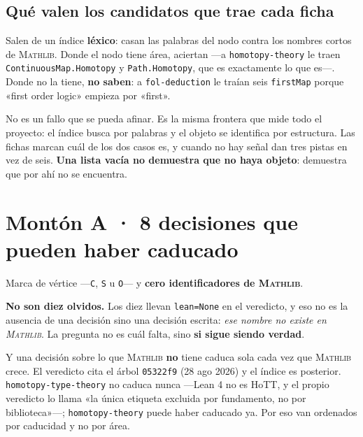 \documentclass[10pt,a4paper]{article}
\newcommand{\Mathlib}{\textsc{Mathlib}}
\begin{document}
\subsection*{Qué valen los candidatos que trae cada ficha}
\noindent Salen de un índice \textbf{léxico}: casan las palabras del nodo
contra los nombres cortos de \Mathlib{}. Donde el nodo tiene área, aciertan —a
\texttt{homotopy-theory} le traen \texttt{ContinuousMap.Homotopy} y
\texttt{Path.Homotopy}, que es exactamente lo que es—. Donde no la tiene,
\textbf{no saben}: a \texttt{fol-deduction} le traían seis \texttt{firstMap}
porque «first order logic» empieza por «first».\par\medskip
\noindent No es un fallo que se pueda afinar. Es la misma frontera que mide
todo el proyecto: el índice busca por palabras y el objeto se identifica por
estructura. Las fichas marcan cuál de los dos casos es, y cuando no hay señal
dan tres pistas en vez de seis. \textbf{Una lista vacía no demuestra que no
haya objeto}: demuestra que por ahí no se encuentra.\par\medskip

\newpage
\section*{Montón A · 8 decisiones que pueden haber caducado}

Marca de vértice —\texttt{C}, \texttt{S} u \texttt{O}— y \textbf{cero
identificadores de \Mathlib{}}.\par\medskip
\noindent\textbf{No son diez olvidos.} Los diez llevan \texttt{lean=None} en
el veredicto, y eso no es la ausencia de una decisión sino una decisión
escrita: \emph{ese nombre no existe en \Mathlib{}}. La pregunta no es cuál
falta, sino \textbf{si sigue siendo verdad}.\par\medskip
\noindent Y una decisión sobre lo que \Mathlib{} \textbf{no} tiene caduca sola
cada vez que \Mathlib{} crece. El veredicto cita el árbol \texttt{05322f9}
(28 ago 2026) y el índice es posterior. \texttt{homotopy-type-theory} no
caduca nunca —Lean 4 no es HoTT, y el propio veredicto lo llama «la única
etiqueta excluida por fundamento, no por biblioteca»—;
\texttt{homotopy-theory} puede haber caducado ya. Por eso van ordenados por
caducidad y no por área.
\par\medskip
\end{document}
